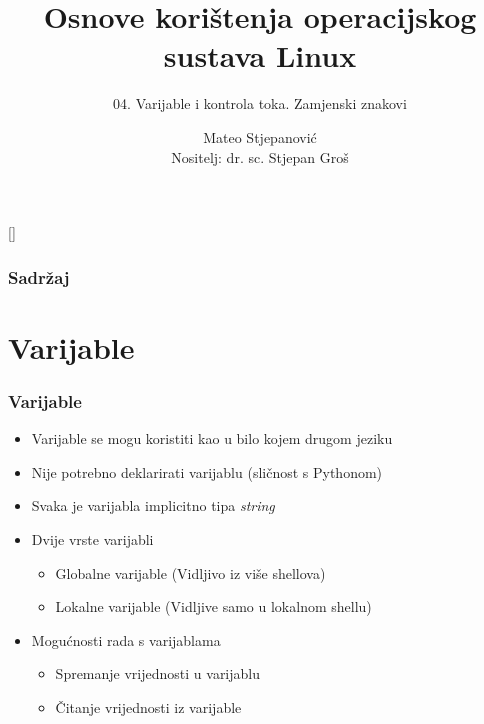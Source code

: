 \documentclass{beamer}
\title{Osnove korištenja operacijskog sustava Linux}
\subtitle{04. Varijable i kontrola toka. Zamjenski znakovi}
\author[Mateo Stjepanović]{Mateo Stjepanović\\{\small Nositelj: dr. sc. Stjepan Groš}}
\institute[FER]{Sveučilište u Zagrebu \\
				Fakultet elektrotehnike i računarstva}
\date{\todayiso}
\begin{document}
{
[] %

\begin{frame}
\maketitle
\end{frame}
}

\begin{frame}
\frametitle{Sadržaj}
\tableofcontents
\end{frame}

\section{Varijable}
\begin{frame}[t]
\frametitle{Varijable}
\begin{itemize}
	\item Varijable se mogu koristiti kao u bilo kojem drugom jeziku
	\item Nije potrebno deklarirati varijablu (sličnost s Pythonom)
 	\item Svaka je varijabla implicitno tipa \textit{string}
	\item Dvije vrste varijabli
  	\begin{itemize}
  		\item Globalne varijable (Vidljivo iz više shellova)
  		\item Lokalne varijable (Vidljive samo u lokalnom shellu)
  	\end{itemize}
  
	\item Mogućnosti rada s varijablama
 	\begin{itemize}
 		\item Spremanje vrijednosti u varijablu
		\item Čitanje vrijednosti iz varijable
	\end{itemize}
\end{itemize}
\end{frame}
\end{document}
